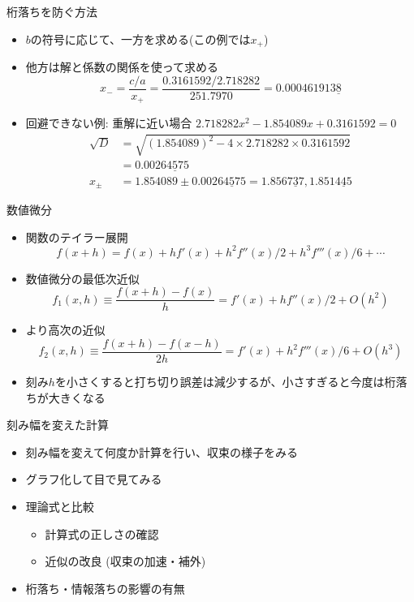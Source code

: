 \begin{frame}[t,fragile]{桁落ちを防ぐ方法}
  \begin{itemize}
    \setlength{\itemsep}{1em}
  \item $b$の符号に応じて、一方を求める(この例では$x_+$)
  \item 他方は解と係数の関係を使って求める
    \[
    x_- = \frac{c/a}{x_+} = \frac{0.3161592 / 2.718282}{251.7970} = 0.000461913\underline{8}
    \]
  \item 回避できない例: 重解に近い場合 $2.718282x^2 - 1.854089x + 0.3161592=0$
    \begin{align*}
      \sqrt{D} &= \sqrt{(1.854089)^2 - 4 \times 2.718282 \times 0.3161592} \\ &= 0.002\underline{64575} \\
      x_\pm &= 1.854089 \pm 0.002\underline{64575} = 1.856\underline{737}, 1.851\underline{445}
    \end{align*}
  \end{itemize}
\end{frame}

\begin{frame}[t,fragile]{数値微分}
  \begin{itemize}
    \setlength{\itemsep}{1em}
  \item 関数のテイラー展開
    \[
    f(x+h) = f(x) + h f'(x) + h^2 f''(x)/2 + h^3 f'''(x)/6 + \cdots
    \]
  \item 数値微分の最低次近似
    \[
    f_1(x,h) \equiv \frac{f(x+h)-f(x)}{h} = f'(x) + h f''(x)/2 + O(h^2)
    \]
  \item より高次の近似
    \[
    f_2(x,h) \equiv \frac{f(x+h)-f(x-h)}{2h} = f'(x) + h^2 f'''(x)/6 + O(h^3)
    \]
  \item 刻み$h$を小さくすると打ち切り誤差は減少するが、小さすぎると今度は桁落ちが大きくなる
  \end{itemize}
\end{frame}

\begin{frame}[t,fragile]{刻み幅を変えた計算}
  \begin{itemize}
    \setlength{\itemsep}{1em}
  \item 刻み幅を変えて何度か計算を行い、収束の様子をみる
  \item グラフ化して目で見てみる
  \item 理論式と比較
    \begin{itemize}
    \item 計算式の正しさの確認
    \item 近似の改良 (収束の加速・補外)
    \end{itemize}
  \item 桁落ち・情報落ちの影響の有無
  \end{itemize}
\end{frame}
